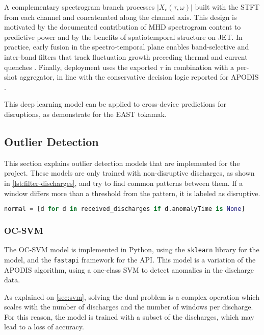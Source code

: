 A complementary spectrogram branch processes $|X_c(\tau,\omega)|$ built with the \ac{STFT} from each channel and concatenated along the channel axis. This design is motivated by the documented contribution of \ac{MHD} spectrogram content to predictive power and by the benefits of spatiotemporal structure on \ac{JET}. In practice, early fusion in the spectro-temporal plane enables band-selective and inter-band filters that track fluctuation growth preceding thermal and current quenches \cite{aymerichMHDSpectrogramContribution2024,aymerichDisruptionPredictionJET2022}. Finally, deployment uses the exported $\tau$ in combination with a per-shot aggregator, in line with the conservative decision logic reported for \ac{APODIS} \cite{dormido-cantoDevelopmentEfficientRealtime2013}.

This deep learning model can be applied to cross-device predictions for disruptions, as \textcite{guoDisruptionPredictionUsing2020} demonstrate for the \ac{EAST} tokamak.

\subsection{Outlier Detection}

This section explains outlier detection models that are implemented for the project. These models are only trained with non-disruptive discharges, as shown in \autoref{lst:filter-discharges}, and try to find common patterns between them. If a window differs more than a threshold from the pattern, it is labeled as disruptive.

\begin{lstlisting}[language=Python, caption={Filtering discharges on outlier detection models. Extracted from \ac{IForest} repository \autocite{OutlierClassifierPy_iforestPython}.}, label={lst:filter-discharges}]
normal = [d for d in received_discharges if d.anomalyTime is None]
\end{lstlisting}

\subsubsection{\acs{OC-SVM}}

The \ac{OC-SVM} model is implemented in Python, using the \texttt{sklearn} library for the model, and the \texttt{fastapi} framework for the API. This model is a variation of the \ac{APODIS} algorithm, using a one-class \ac{SVM} to detect anomalies in the discharge data.

As explained on \autoref{sec:svm}, solving the dual problem is a complex operation which scales with the number of discharges and the number of windows per discharge. For this reason, the model is trained with a subset of the discharges, which may lead to a loss of accuracy.

